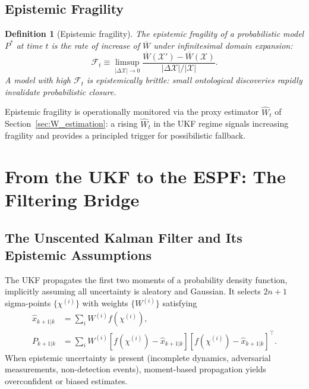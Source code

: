 \documentclass[12pt]{article}
\newtheorem{definition}[theorem]{Definition}
\newcommand{\calX}{\mathcal{X}}
\begin{document}
\subsection{Epistemic Fragility}

\begin{definition}[Epistemic fragility]
\label{def:fragility}
The \emph{epistemic fragility} of a probabilistic model $P^*$ at time $t$
is the rate of increase of $\overline{W}$ under infinitesimal domain expansion:
\begin{equation}
\mathcal{F}_t \equiv \limsup_{|\Delta\calX|\to 0}
\frac{\overline{W}(\calX')-\overline{W}(\calX)}{|\Delta\calX|/|\calX|}.
\label{eq:fragility}
\end{equation}
A model with high $\mathcal{F}_t$ is epistemically brittle: small ontological
discoveries rapidly invalidate probabilistic closure.
\end{definition}

Epistemic fragility is operationally monitored via the proxy estimator
$\widehat{W}_t$ of Section~\ref{sec:W_estimation}:
a rising $\widehat{W}_t$ in the UKF regime signals increasing fragility
and provides a principled trigger for possibilistic fallback.

\section{From the UKF to the ESPF: The Filtering Bridge}
\label{sec:filtering}

\subsection{The Unscented Kalman Filter and Its Epistemic Assumptions}

The UKF \cite{julier1997} propagates the first two moments of a probability
density function, implicitly assuming all uncertainty is aleatory and Gaussian.
It selects $2n+1$ sigma-points $\{\chi^{(i)}\}$ with weights $\{W^{(i)}\}$
satisfying
\begin{align}
\hat{x}_{k+1|k} &= \sum_i W^{(i)} f(\chi^{(i)}), \\
P_{k+1|k} &= \sum_i W^{(i)}[f(\chi^{(i)})-\hat{x}_{k+1|k}][f(\chi^{(i)})-\hat{x}_{k+1|k}]^\top.
\end{align}
When epistemic uncertainty is present (incomplete dynamics, adversarial
measurements, non-detection events), moment-based propagation yields
overconfident or biased estimates.
\end{document}
